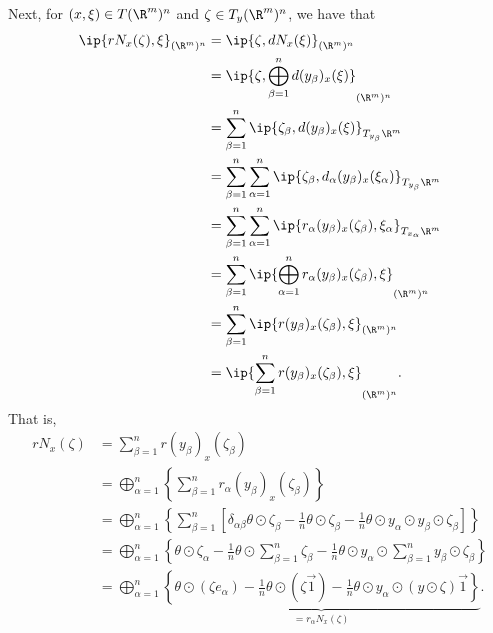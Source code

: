 Next, for $(x,\xi)\in T(\R^m)^n$ and $\zeta\in T_y(\R^m)^n$, we have that
\begin{align*}
	\ip{rN_x(\zeta),\xi}_{(\R^m)^n}&=\ip{\zeta,dN_x(\xi)}_{(\R^m)^n}\\
	&=\ip{\zeta,\bigoplus_{\beta=1}^n d(y_\beta)_x(\xi)}_{(\R^m)^n}\\
	&=\sum_{\beta=1}^n\ip{\zeta_\beta,d(y_\beta)_x(\xi)}_{T_{y_\beta}\R^m}\\
	&=\sum_{\beta=1}^n\sum_{\alpha=1}^n\ip{\zeta_\beta,d_\alpha(y_\beta)_x(\xi_\alpha)}_{T_{y_\beta}\R^m}\\
	&=\sum_{\beta=1}^n\sum_{\alpha=1}^n\ip{r_\alpha(y_\beta)_x(\zeta_\beta),\xi_\alpha}_{T_{x_\alpha}\R^m}\\
	&=\sum_{\beta=1}^n\ip{\bigoplus_{\alpha=1}^nr_\alpha(y_\beta)_x(\zeta_\beta),\xi}_{(\R^m)^n}\\
	&=\sum_{\beta=1}^n\ip{r(y_\beta)_x(\zeta_\beta),\xi}_{(\R^m)^n}\\
	&=\ip{\sum_{\beta=1}^nr(y_\beta)_x(\zeta_\beta),\xi}_{(\R^m)^n}.
\end{align*}
That is,
\begin{align*}
	rN_x(\zeta)&=\sum_{\beta=1}^nr(y_\beta)_x(\zeta_\beta)\\
	&=\bigoplus_{\alpha=1}^n\left\{\sum_{\beta=1}^nr_\alpha(y_\beta)_x(\zeta_\beta)\right\}\\
	&=\bigoplus_{\alpha=1}^n\left\{\sum_{\beta=1}^n\left[\delta_{\alpha\beta}\theta\odot\zeta_\beta-\frac{1}{n}\theta\odot\zeta_\beta-\frac{1}{n}\theta\odot y_\alpha\odot y_\beta\odot\zeta_\beta\right]\right\}\\
	&=\bigoplus_{\alpha=1}^n\left\{\theta\odot\zeta_\alpha-\frac{1}{n}\theta\odot\sum_{\beta=1}^n\zeta_\beta -\frac{1}{n}\theta\odot y_\alpha\odot\sum_{\beta=1}^ny_\beta\odot\zeta_\beta\right\}\\
	&=\bigoplus_{\alpha=1}^n\underbrace{\left\{\theta\odot(\zeta e_\alpha)-\frac{1}{n}\theta\odot(\zeta\vec{1})-\frac{1}{n}\theta\odot y_\alpha\odot(y\odot\zeta)\vec{1}	\right\}}_{=r_\alpha N_x(\zeta)}.
\end{align*}

